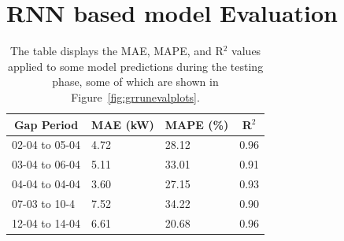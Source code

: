 
\section{RNN based model Evaluation}\label{sec:rnneval}

\begin{table}[H]
	\begin{center}
		\begin{tabular}[c]{l|l|l|l}
			\multicolumn{1}{c|}{\textbf{Gap Period}} &
			\multicolumn{1}{c|}{\textbf{MAE (kW)}}   &
			\multicolumn{1}{c|}{\textbf{MAPE (\%)}}  &
			\multicolumn{1}{c}{\textbf{R}$^2$}                             \\
			\hline

			02-04 to 05-04                           & 4.72 & 28.12 & 0.96 \\
			03-04 to 06-04                           & 5.11 & 33.01 & 0.91 \\
			04-04 to 04-04                           & 3.60 & 27.15 & 0.93 \\
			07-03 to 10-4                            & 7.52 & 34.22 & 0.90 \\
			12-04 to 14-04                           & 6.61 & 20.68 & 0.96
		\end{tabular}
	\end{center}
	\caption{The table displays the MAE, MAPE, and R$^2$ values applied to some model predictions during the testing phase, some of which are shown in Figure~\ref{fig:grrunevalplots}.
	}\label{tab:grrunpmaer}
\end{table}


